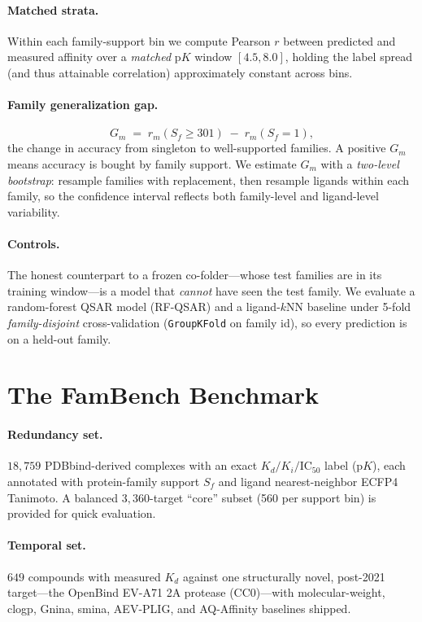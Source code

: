 \documentclass[11pt]{article}
\begin{document}
\paragraph{Matched strata.} Within each family-support bin we compute Pearson $r$ between
predicted and measured affinity over a \emph{matched} $\mathrm{p}K$ window $[4.5, 8.0]$, holding
the label spread (and thus attainable correlation) approximately constant across bins.

\paragraph{Family generalization gap.}
\begin{equation}
G_m \;=\; r_m(S_f \ge 301) \;-\; r_m(S_f = 1),
\end{equation}
the change in accuracy from singleton to well-supported families. A positive $G_m$ means accuracy
is bought by family support. We estimate $G_m$ with a \emph{two-level bootstrap}: resample
families with replacement, then resample ligands within each family, so the confidence interval
reflects both family-level and ligand-level variability.

\paragraph{Controls.} The honest counterpart to a frozen co-folder---whose test families are in
its training window---is a model that \emph{cannot} have seen the test family. We evaluate a
random-forest QSAR model (RF-QSAR) and a ligand-$k$NN baseline under 5-fold \emph{family-disjoint}
cross-validation (\texttt{GroupKFold} on family id), so every prediction is on a held-out family.

\section{The FamBench Benchmark}
\label{sec:design}

\paragraph{Redundancy set.} $18{,}759$ PDBbind-derived complexes with an exact $K_d/K_i/$IC$_{50}$
label ($\mathrm{p}K$), each annotated with protein-family support $S_f$ and ligand
nearest-neighbor ECFP4 Tanimoto. A balanced $3{,}360$-target ``core'' subset (560 per support bin)
is provided for quick evaluation.

\paragraph{Temporal set.} $649$ compounds with measured $K_d$ against one structurally novel,
post-2021 target---the OpenBind EV-A71 2A protease \citep{openbind2026dataset} (CC0)---with
molecular-weight, clogp, Gnina, smina, AEV-PLIG, and AQ-Affinity baselines shipped.
\end{document}
